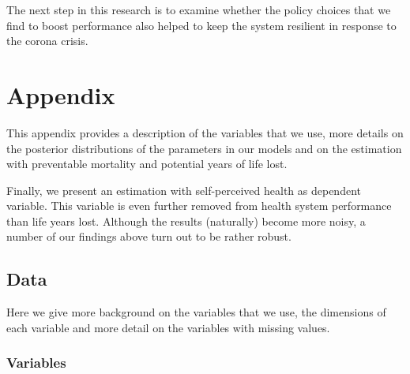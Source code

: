 \documentclass{article}
\begin{document}
The next step in this research is to examine whether the policy choices that we find to boost performance also helped to keep the system resilient in response to the corona crisis.





\newpage
\appendix



\section{Appendix}
\label{sec:orga0811f5}

This appendix provides a description of the variables that we use, more details on the posterior distributions of the parameters in our models and on the estimation with preventable mortality and potential years of life lost.

Finally, we present an estimation with self-perceived health as dependent variable. This variable is even further removed from health system performance than life years lost. Although the results (naturally) become more noisy, a number of our findings above turn out to be rather robust.

\subsection{Data}
\label{sec:org1a1caa5}

Here we give more background on the variables that we use, the dimensions of each variable and more detail on the variables with missing values.

\subsubsection{Variables}
\label{sec:orgc48d0f3}
\end{document}
